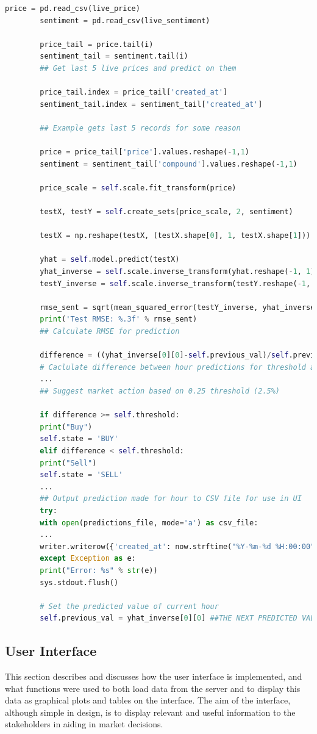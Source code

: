 \documentclass[oneside, 12pt]{article}
\begin{document}
		\begin{lstlisting}[language=python, caption=Forecasting future price of next hour for Bitcoin]
		price = pd.read_csv(live_price)
		sentiment = pd.read_csv(live_sentiment)
		
		price_tail = price.tail(i)
		sentiment_tail = sentiment.tail(i)
		## Get last 5 live prices and predict on them
		
		price_tail.index = price_tail['created_at']
		sentiment_tail.index = sentiment_tail['created_at']
		
		## Example gets last 5 records for some reason
		
		price = price_tail['price'].values.reshape(-1,1)
		sentiment = sentiment_tail['compound'].values.reshape(-1,1)
		
		price_scale = self.scale.fit_transform(price)
		
		testX, testY = self.create_sets(price_scale, 2, sentiment)
		
		testX = np.reshape(testX, (testX.shape[0], 1, testX.shape[1]))
		
		yhat = self.model.predict(testX)
		yhat_inverse = self.scale.inverse_transform(yhat.reshape(-1, 1))
		testY_inverse = self.scale.inverse_transform(testY.reshape(-1, 1))
		
		rmse_sent = sqrt(mean_squared_error(testY_inverse, yhat_inverse))
		print('Test RMSE: %.3f' % rmse_sent)
		## Calculate RMSE for prediction
		
		difference = ((yhat_inverse[0][0]-self.previous_val)/self.previous_val)*100
		# Caclulate difference between hour predictions for threshold action prediction (below)
		... 
		## Suggest market action based on 0.25 threshold (2.5%)
		
		if difference >= self.threshold:
		print("Buy")
		self.state = 'BUY'
		elif difference < self.threshold:
		print("Sell")
		self.state = 'SELL'
		...
		## Output prediction made for hour to CSV file for use in UI
		try:
		with open(predictions_file, mode='a') as csv_file:
		...
		writer.writerow({'created_at': now.strftime("%Y-%m-%d %H:00:00"), 'next_hour_price': hour, 'current_price': current, 'current_sentiment': senti, 'state': self.state})
		except Exception as e:
		print("Error: %s" % str(e))
		sys.stdout.flush()
		
		# Set the predicted value of current hour
		self.previous_val = yhat_inverse[0][0] ##THE NEXT PREDICTED VALUE IN AN HOUR
		\end{lstlisting}
		
		\newpage
		\subsection{User Interface}
		This section describes and discusses how the user interface is implemented, and what functions were used to both load data from the server and to display this data as graphical plots and tables on the interface.
		The aim of the interface, although simple in design, is to display relevant and useful information to the stakeholders in aiding in market decisions. 
		
\end{document}
